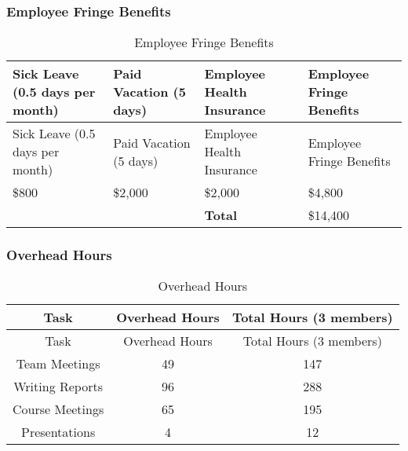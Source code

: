 \subsubsection{Employee Fringe Benefits}
\begin{center}
\setlength{\extrarowheight}{1.5pt}
  \begin{longtable}{|p{3cm}|p{3cm}|p{3cm}|p{3cm}|}
 \caption{Employee Fringe Benefits} \\
   \hline
  
  \centering Sick Leave (0.5 days per month) & Paid Vacation (5 days) & Employee Health Insurance & Employee Fringe Benefits \\
  \hline \hline \endfirsthead
  
     \hline

	\centering Sick Leave (0.5 days per month) & Paid Vacation (5 days) & Employee Health Insurance & Employee Fringe Benefits \\
	\hline \hline \endhead
  
  \endfoot  

    \$800 & \$2,000 & \$2,000 & \$4,800  \\ \hline
    \multicolumn{1}{l}{}      & \multicolumn{1}{l}{}      & \multicolumn{1}{l}{\textbf{Total}} & \multicolumn{1}{l}{\$14,400}  \\
          
           \end{longtable}
\end{center}

\subsubsection{Overhead Hours}

\begin{center}
\setlength{\extrarowheight}{1.5pt}
  \begin{longtable}{|c|c|c|}
 \caption{Overhead Hours\label{overheadHours}} \\
   \hline
  
  \centering Task & Overhead Hours & Total Hours (3 members) \\
  \hline \hline \endfirsthead
  
     \hline

	\centering Task & Overhead Hours & Total Hours (3 members) \\
	\hline \hline \endhead

 \endfoot  

	Team Meetings & 49 & 147 \\ \hline
	Writing Reports & 96 & 288 \\ \hline
	Course Meetings & 65 & 195 \\ \hline	  
	Presentations & 4 & 12 \\ \hline
    \end{longtable}
\end{center}